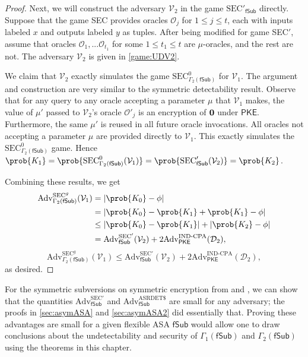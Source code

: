 \begin{proof}
Next, we will construct the adversary $\mathcal{V}_2$ in the game $\mathrm{SEC'}_{\mathsf{fSub}}$ directly. Suppose that the game SEC provides oracles $\mathcal{O}_j$ for $1\le j\le t$, each with inputs labeled $x$ and outputs labeled $y$ as tuples. After being modified for game SEC$'$, assume that oracles $\mathcal{O}_1, ... \mathcal{O}_{t_1}$ for some $1 \le t_1 \le t$ are $\mu$-oracles, and the rest are not. The adversary $\mathcal{V}_2$ is given in \autoref{game:UDV2}.

We claim that $\mathcal{V}_2$ exactly simulates the game $\mathrm{SEC}^0_{\Gamma_2(\mathsf{fSub})}$ for $\mathcal{V}_1$. The argument and construction are very similar to the symmetric detectability result. Observe that for any query to any oracle accepting a parameter $\mu$ that $\mathcal{V}_1$ makes, the value of $\mu'$ passed to $\mathcal{V}_2$'s oracle $\mathcal{O}'_j$ is an encryption of $\bf{0}$ under $\mathsf{PKE}$. Furthermore, the same $\mu'$ is reused in all future oracle invocations. All oracles not accepting a parameter $\mu$ are provided directly to $\mathcal{V}_1$. This exactly simulates the $\mathrm{SEC}^0_{\Gamma_2(\mathsf{fSub})}$ game. Hence $\prob{K_1}=\prob{\mathrm{SEC}^0_{\Gamma_2(\mathsf{fSub})}(\mathcal{V}_1)}=\prob{\mathrm{SEC}'_{\mathsf{fSub}}(\mathcal{V}_2)}=\prob{K_2}$.

Combining these results, we get
\iffullversion
\begin{align*}
\mathrm{Adv}^{\mathrm{SEC}^g}_{\Gamma_2(\mathsf{fSub})}(\mathcal{V}_1)
&= |\prob{K_0}-\phi| \\
&= |\prob{K_0}-\prob{K_1}+\prob{K_1}-\phi| \\
&\le |\prob{K_0}-\prob{K_1}|+|\prob{K_2}-\phi| \\
&= \mathrm{Adv}^{\mathrm{SEC'}}_{\mathsf{fSub}}(\mathcal{V}_2) + 2\mathrm{Adv}^{\mathrm{IND}\text{-}\mathrm{CPA}}_\mathsf{PKE}(\mathcal{D}_2),
\end{align*}
\else
\[
\mathrm{Adv}^{\mathrm{SEC}^g}_{\Gamma_2(\mathsf{fSub})}(\mathcal{V}_1) \le \mathrm{Adv}^{\mathrm{SEC'}}_{\mathsf{fSub}}(\mathcal{V}_2) + 2\mathrm{Adv}^{\mathrm{IND}\text{-}\mathrm{CPA}}_\mathsf{PKE}(\mathcal{D}_2),
\]
\fi
as desired.
\end{proof}

For the symmetric subversions on symmetric encryption from \cite{C:BelPatRog14} and \cite{CCS:BelJaeKan15}, we can show that the quantities $\mathrm{Adv}^{\mathrm{SEC'}}_{\mathsf{fSub}}$ and $\mathrm{Adv}^{\mathrm{ASRDET}\$}_{\mathsf{fSub}}$ are small for any adversary; the proofs in \autoref{sec:asymASA} and \autoref{sec:asymASA2} did essentially that. Proving these advantages are small for a given flexible ASA $\mathsf{fSub}$ would allow one to draw conclusions about the undetectability and security of $\Gamma_1(\mathsf{fSub})$ and $\Gamma_2(\mathsf{fSub})$ using the theorems in this chapter.